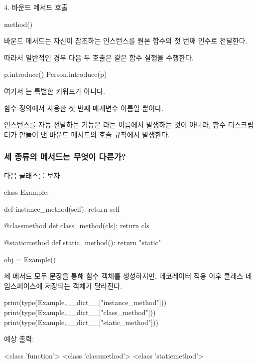\begin{dhknote}
\begin{dhksmry}[centered]
4. 바운드 메서드 호출
\end{dhksmry}
\end{dhknote}

\begin{dhkcode}
method()
\end{dhkcode}

바운드 메서드는 자신이 참조하는 인스턴스를 원본 함수의 첫 번째 인수로 전달한다.

따라서 일반적인 경우 다음 두 호출은 같은 함수 실행을 수행한다.

\begin{dhkcode}
p.introduce()
Person.introduce(p)
\end{dhkcode}

여기서 는 특별한 키워드가 아니다.

함수 정의에서 사용한 첫 번째 매개변수 이름일 뿐이다.

인스턴스를 자동 전달하는 기능은 라는 이름에서 발생하는 것이 아니라, 함수 디스크립터가 만들어 낸 바운드 메서드의 호출 규칙에서 발생한다.

\subsubsection{세 종류의 메서드는 무엇이 다른가?}

다음 클래스를 보자.

\begin{dhkcode}
class Example:

    def instance_method(self):
        return self

    @classmethod
    def class_method(cls):
        return cls

    @staticmethod
    def static_method():
        return "static"


obj = Example()
\end{dhkcode}

세 메서드 모두  문장을 통해 함수 객체를 생성하지만, 데코레이터 적용 이후 클래스 네임스페이스에 저장되는 객체가 달라진다.

\begin{dhkcode}
print(type(Example.__dict__["instance_method"]))
print(type(Example.__dict__["class_method"]))
print(type(Example.__dict__["static_method"]))
\end{dhkcode}

예상 출력:

\begin{dhkzsh}
<class 'function'>
<class 'classmethod'>
<class 'staticmethod'>
\end{dhkzsh}


